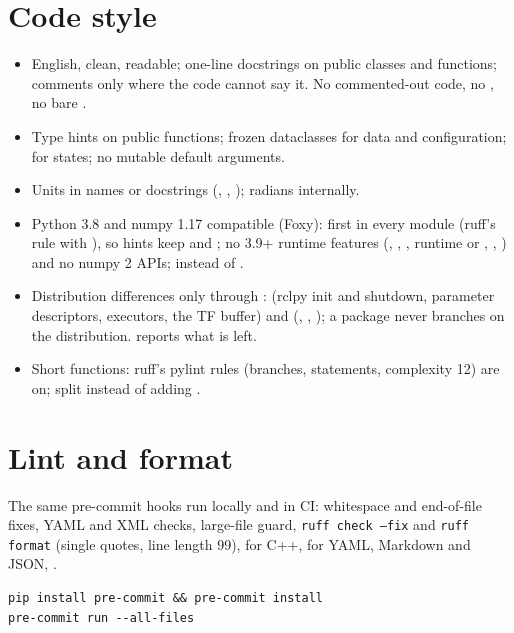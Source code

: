 \section{Code style}

\begin{itemize}
  \item English, clean, readable; one-line docstrings on public classes and functions; comments
    only where the code cannot say it. No commented-out code, no , no bare
    .
  \item Type hints on public functions; frozen dataclasses for data and configuration; 
    for states; no mutable default arguments.
  \item Units in names or docstrings (, , ); radians internally.
  \item Python 3.8 and numpy 1.17 compatible (Foxy): 
    first in every module (ruff's  rule with ), so hints
    keep  and ; no 3.9+ runtime features
    (, , , runtime
     or , , ) and no numpy 2 APIs;
     instead of .
  \item Distribution differences only through :  (rclpy
    init and shutdown, parameter descriptors, executors, the TF buffer) and 
    (, , );
    a package never branches on the distribution.  reports what is left.
  \item Short functions: ruff's pylint rules (branches, statements, complexity 12) are on; split
    instead of adding .
\end{itemize}

\section{Lint and format}

The same pre-commit hooks run locally and in CI: whitespace and end-of-file fixes, YAML and XML
checks, large-file guard, \texttt{ruff check --fix} and \texttt{ruff format} (single quotes, line
length 99),  for C++,  for YAML, Markdown and JSON,
.
\begin{lstlisting}
pip install pre-commit && pre-commit install
pre-commit run --all-files
\end{lstlisting}

